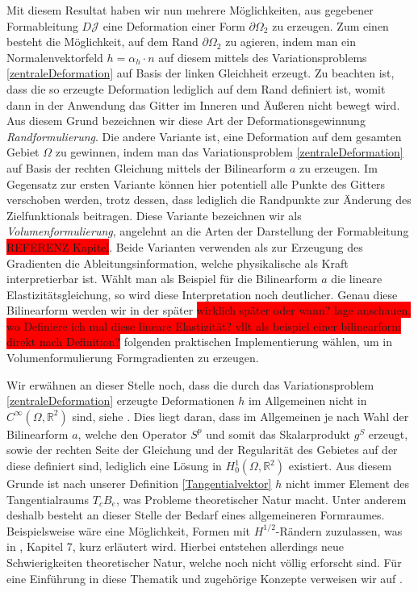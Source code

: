 Mit diesem Resultat haben wir nun mehrere Möglichkeiten, aus gegebener Formableitung $D\mathcal{J}$ eine Deformation einer Form $\partial\Omega_2$ zu erzeugen. Zum einen besteht die Möglichkeit, auf dem Rand $\partial\Omega_2$ zu agieren, indem man ein Normalenvektorfeld $h = \alpha_h \cdot n$ auf diesem mittels des Variationsproblems \ref{zentraleDeformation} auf Basis der linken Gleichheit erzeugt. Zu beachten ist, dass die so erzeugte Deformation lediglich auf dem Rand definiert ist, womit dann in der Anwendung das Gitter im Inneren und Äußeren nicht bewegt wird. Aus diesem Grund bezeichnen wir diese Art der Deformationsgewinnung \textit{Randformulierung}. Die andere Variante ist, eine Deformation auf dem gesamten Gebiet $\Omega$ zu gewinnen, indem man das Variationsproblem \ref{zentraleDeformation} auf Basis der rechten Gleichung mittels der Bilinearform 
$a$ zu erzeugen. Im Gegensatz zur ersten Variante können hier potentiell alle Punkte des Gitters verschoben werden, trotz dessen, dass lediglich die Randpunkte zur Änderung des Zielfunktionals beitragen. Diese Variante bezeichnen wir als \textit{Volumenformulierung}, angelehnt an die Arten der Darstellung der Formableitung \colorbox{red}{REFERENZ Kapitel}. Beide Varianten verwenden als zur Erzeugung des Gradienten die Ableitungsinformation, welche physikalische als Kraft interpretierbar ist. Wählt man als Beispiel für die Bilinearform $a$ die lineare Elastizitätsgleichung, so wird diese Interpretation noch deutlicher. Genau diese Bilinearform werden wir in der später \colorbox{red}{wirklich später oder wann? lage anschauen, wo Definiere ich mal diese lineare Elastizität? vllt als beispiel einer bilinearform direkt nach Definition?} folgenden praktischen Implementierung wählen, um in Volumenformulierung Formgradienten zu erzeugen.

Wir erwähnen an dieser Stelle noch, dass die durch das Variationsproblem \ref{zentraleDeformation} erzeugte Deformationen $h$ im Allgemeinen nicht in $C^\infty(\Omega,\mathbb{R}^2)$ sind, siehe \cite{bfgs1}. Dies liegt daran, dass im Allgemeinen je nach Wahl der Bilinearform $a$, welche den Operator $S^p$ und somit das Skalarprodukt $g^S$ erzeugt, sowie der rechten Seite der Gleichung und der Regularität des Gebietes auf der diese definiert sind, lediglich eine Lösung in $H^1_0(\Omega,\mathbb{R}^2)$ existiert. Aus diesem Grunde ist nach unserer Definition \ref{Tangentialvektor} $h$ nicht immer Element des Tangentialraums $T_cB_e$, was Probleme theoretischer Natur macht. Unter anderem deshalb besteht an dieser Stelle der Bedarf eines allgemeineren Formraumes. Beispielsweise wäre eine Möglichkeit, Formen mit $H^{1/2}$-Rändern zuzulassen, was in \cite{shape_space}, Kapitel 7, kurz erläutert wird. Hierbei entstehen allerdings neue Schwierigkeiten theoretischer Natur, welche noch nicht völlig erforscht sind. Für eine Einführung in diese Thematik und zugehörige Konzepte verweisen wir auf \cite{diffeology}.

